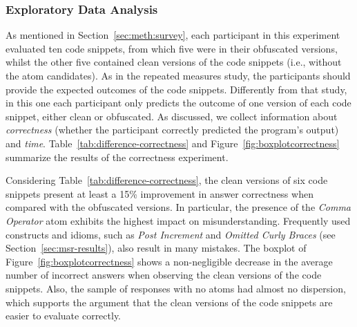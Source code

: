 \subsubsection*{Exploratory Data Analysis}

As mentioned in Section~\ref{sec:meth:survey}, each participant in this experiment evaluated ten code snippets, from which five were in their obfuscated versions, whilst the other five contained clean versions of the code snippets (i.e., without the atom candidates). As in the repeated measures study, the participants should provide the expected outcomes of the code snippets. Differently from that study, in this one each participant only predicts the outcome of one version of each code snippet, either clean or obfuscated. As discussed, we collect information about \emph{correctness} (whether the participant correctly predicted the program's output) and \emph{time}. 
Table~\ref{tab:difference-correctness} and Figure~\ref{fig:boxplotcorrectness} summarize the results of the correctness experiment.

Considering Table~\ref{tab:difference-correctness}, the clean versions of six code snippets present at least a 15\% improvement in answer correctness when compared with the obfuscated versions. In particular, the presence of the \emph{Comma Operator} atom exhibits the highest impact on misunderstanding. 
Frequently used constructs and idioms, such as \emph{Post Increment} and \emph{Omitted Curly Braces} (see Section~\ref{sec:msr-results}), also result in many mistakes. %
The boxplot of Figure~\ref{fig:boxplotcorrectness} shows a non-negligible decrease in the average number of incorrect answers when observing the clean versions of the code snippets. Also, the sample of responses with no atoms had almost no dispersion, which supports the argument that the clean versions of the code snippets are easier to evaluate correctly. 


